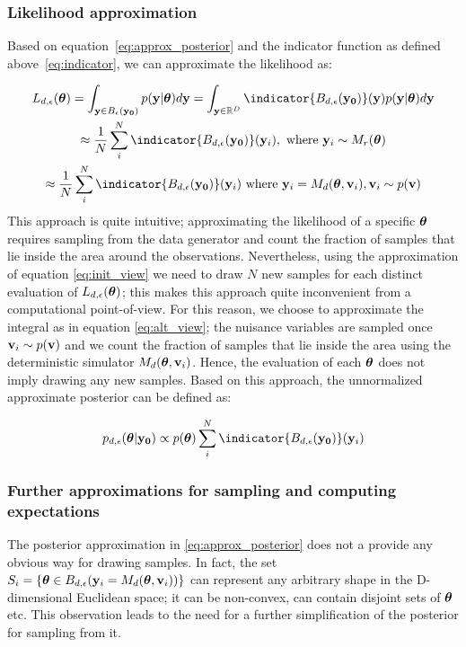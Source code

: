 \subsubsection*{Likelihood approximation}

Based on equation~\eqref{eq:approx_posterior} and the indicator
function as defined above~\eqref{eq:indicator}, we can approximate
the likelihood as:

\begin{gather} \label{eq:approx_likelihood}
  L_{d, \epsilon}(\thetab) =
  \int_{\yb \in B_\epsilon(\data)}p(\yb|\thetab)d\yb =
  \int_{\yb \in \R^D} \indicator{\region(\data)}(\yb)p(\yb|\thetab)d\yb\\
  \approx \frac{1}{N} \sum_i^N \indicator{\region(\data)}(\yb_i),\text{ where }
  \yb_i \sim M_r(\thetab) \label{eq:init_view}\\
  \approx \frac{1}{N} \sum_i^N \indicator{\region (\data)} (\yb_i)
  \text{ where } \yb_i = M_d(\thetab, \vb_i), \vb_i \sim p(\vb) \label{eq:alt_view}
\end{gather}
%
This approach is quite intuitive; approximating the likelihood of a
specific $\boldsymbol{\theta}$ requires sampling from the data generator and count
the fraction of samples that lie inside the area around the
observations. Nevertheless, using the approximation of equation
\eqref{eq:init_view} we need to draw $N$ new samples for each distinct
evaluation of $L_{d,\epsilon}(\boldsymbol{\theta})$; this makes this approach
quite inconvenient from a computational point-of-view. For this
reason, we choose to approximate the integral as in equation
\eqref{eq:alt_view}; the nuisance variables are sampled once
$\mathbf{v}_i \sim p(\mathbf{v})$ and we count the fraction of samples that lie
inside the area using the deterministic simulator
$M_d(\boldsymbol{\theta}, \mathbf{v}_i)$. Hence, the evaluation of each $\boldsymbol{\theta}$ does
not imply drawing any new samples. Based on this approach, the
unnormalized approximate posterior can be defined as:

\begin{equation} \label{eq:aprox_posterior}
  p_{d,\epsilon}(\thetab|\data)
  \propto p(\thetab) \sum_i^N \indicator{ \region(\data)} (\yb_i)
\end{equation}

\subsubsection*{Further approximations for sampling and computing expectations}

The posterior approximation in \eqref{eq:approx_posterior} does not a
provide any obvious way for drawing samples. In fact, the set
$S_i = \{ \boldsymbol{\theta} \in B_{d,\epsilon}(\mathbf{y}_i=M_d(\boldsymbol{\theta}, \mathbf{v}_i)) \}$ can represent
any arbitrary shape in the D-dimensional Euclidean space; it can be
non-convex, can contain disjoint sets of $\boldsymbol{\theta}$ etc. This
observation leads to the need for a further simplification of the
posterior for sampling from it.

